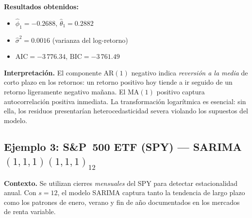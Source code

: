 \documentclass[12pt,a4paper]{article}
\begin{document}
\textbf{Resultados obtenidos:}
\begin{itemize}
  \item $\hat{\phi}_1 = -0.2688$, \quad $\hat{\theta}_1 = 0.2882$
  \item $\hat{\sigma}^2 = 0.0016$ (varianza del log-retorno)
  \item $\mathrm{AIC} = -3\,776.34$, \quad $\mathrm{BIC} = -3\,761.49$
\end{itemize}

\textbf{Interpretación.} El componente AR$(1)$ negativo indica \emph{reversión a la
media} de corto plazo en los retornos: un retorno positivo hoy tiende a ir seguido de
un retorno ligeramente negativo mañana. El MA$(1)$ positivo captura autocorrelación
positiva inmediata. La transformación logarítmica es esencial: sin ella, los residuos
presentarían heterocedasticidad severa violando los supuestos del modelo.

\subsection{Ejemplo 3: S\&P~500 ETF (SPY) --- SARIMA$(1,1,1)(1,1,1)_{12}$}

\textbf{Contexto.} Se utilizan cierres \emph{mensuales} del SPY para detectar
estacionalidad anual. Con $s=12$, el modelo SARIMA captura tanto la tendencia de largo
plazo como los patrones de enero, verano y fin de año documentados en los mercados de
renta variable.
\end{document}
